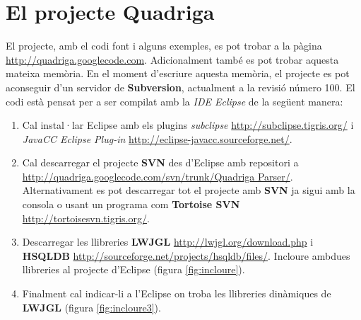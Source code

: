 \chapter{El projecte Quadriga}

El projecte, amb el codi font i alguns exemples, es pot trobar a la pàgina \url{http://quadriga.googlecode.com}. Adicionalment també es pot trobar aquesta mateixa memòria. En el moment d'escriure aquesta memòria, el projecte es pot aconseguir d'un servidor de {\bf Subversion}, actualment a la revisió número 100. El codi està pensat per a ser compilat amb la {\em IDE Eclipse} de la següent manera:

\begin{enumerate}
  \item Cal instal·lar Eclipse amb els plugins {\em subclipse} \url{http://subclipse.tigris.org/} i {\em JavaCC Eclipse Plug-in} \url{http://eclipse-javacc.sourceforge.net/}.
  
  \item Cal descarregar el projecte {\bf SVN} des d'Eclipse amb repositori a \url{http://quadriga.googlecode.com/svn/trunk/Quadriga Parser/}. \\
        Alternativament es pot descarregar tot el projecte amb {\bf SVN} ja sigui amb la consola o usant un programa com {\bf Tortoise SVN} \url{http://tortoisesvn.tigris.org/}.
        
  \item Descarregar les llibreries {\bf LWJGL} \url{http://lwjgl.org/download.php} i {\bf HSQLDB} \url{http://sourceforge.net/projects/hsqldb/files/}. 
        Incloure ambdues llibreries al projecte d'Eclipse (figura \ref{fig:incloure}).
        
  \item Finalment cal indicar-li a l'Eclipse on troba les llibreries dinàmiques de {\bf LWJGL} (figura \ref{fig:incloure3}).
\end{enumerate}

